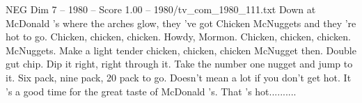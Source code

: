 \begin{textsample}{NEG Dim 7 – 1980 – Score 1.00 – 1980/tv\_com\_1980\_111.txt}  \label{ex:f7_neg_055}
Down at McDonald 's where the arches glow, they 've got Chicken McNuggets and they 're hot to go.
Chicken, chicken, chicken.
Howdy, Mormon.
Chicken, chicken, chicken.
McNuggets.
Make a light tender chicken, chicken, chicken McNugget then.
Double gut chip.
Dip it right, right through it.
Take the number one nugget and jump to it.
Six pack, nine pack, 20 pack to go.
Doesn't mean a lot if you don't get hot.
It 's a good time for the great taste of McDonald 's.
That 's hot..........

\end{textsample}
